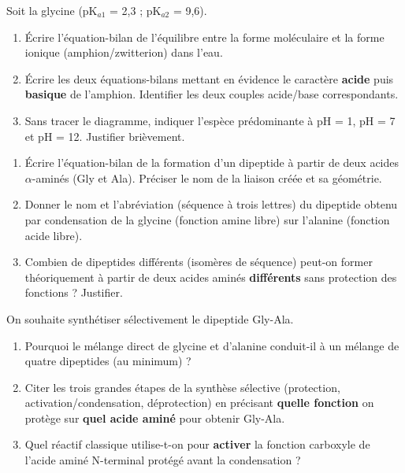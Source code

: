 \documentclass[11pt]{article}
\begin{document}
\begin{exercice}
Soit la glycine (pK$_{a1}$ = 2,3 ; pK$_{a2}$ = 9,6).
\begin{enumerate}
    \item Écrire l'équation-bilan de l'équilibre entre la forme moléculaire et la forme ionique (amphion/zwitterion) dans l'eau.
    \item Écrire les deux équations-bilans mettant en évidence le caractère \textbf{acide} puis \textbf{basique} de l'amphion. Identifier les deux couples acide/base correspondants.
    \item Sans tracer le diagramme, indiquer l'espèce prédominante à pH = 1, pH = 7 et pH = 12. Justifier brièvement.
\end{enumerate}
\end{exercice}

\begin{exercice}
\begin{enumerate}
    \item Écrire l'équation-bilan de la formation d'un dipeptide à partir de deux acides $\alpha$-aminés (Gly et Ala). Préciser le nom de la liaison créée et sa géométrie.
    \item Donner le nom et l'abréviation (séquence à trois lettres) du dipeptide obtenu par condensation de la glycine (fonction amine libre) sur l'alanine (fonction acide libre).
    \item Combien de dipeptides différents (isomères de séquence) peut-on former théoriquement à partir de deux acides aminés \textbf{différents} sans protection des fonctions ? Justifier.
\end{enumerate}
\end{exercice}

\begin{exercice}
On souhaite synthétiser sélectivement le dipeptide Gly-Ala.
\begin{enumerate}
    \item Pourquoi le mélange direct de glycine et d'alanine conduit-il à un mélange de quatre dipeptides (au minimum) ?
    \item Citer les trois grandes étapes de la synthèse sélective (protection, activation/condensation, déprotection) en précisant \textbf{quelle fonction} on protège sur \textbf{quel acide aminé} pour obtenir Gly-Ala.
    \item Quel réactif classique utilise-t-on pour \textbf{activer} la fonction carboxyle de l'acide aminé N-terminal protégé avant la condensation ?
\end{enumerate}
\end{exercice}
\end{document}
